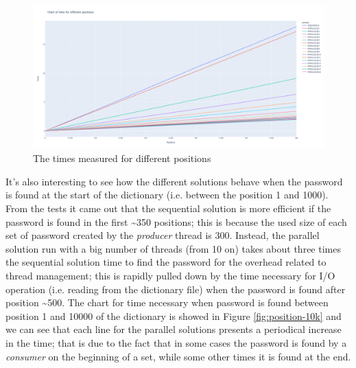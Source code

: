 \documentclass[10pt,twocolumn,letterpaper]{article}
\begin{document}
    \begin{figure}
    \begin{center}
    \includegraphics[width=1.0\linewidth]{./img/positions.png}
    \end{center}
        \caption{The times measured for different positions}
    \label{fig:position}
    \end{figure}

    It’s also interesting to see how the different solutions behave when the password
    is found at the start of the dictionary (i.e. between the position 1 and 1000).
    From the tests it came out that the sequential solution is more efficient if the
    password is found in the first \textasciitilde350 positions; this is because the used size of
    each set of password created by the \emph{producer} thread is 300.
    Instead, the parallel solution run with a big number of threads (from 10 on) takes
    about three times the sequential solution time to find the password for the overhead
    related to thread management; this is rapidly pulled down by the time necessary for
    I/O operation (i.e. reading from the dictionary file) when the password is found
    after position \textasciitilde500.
    The chart for time necessary when password is found between position 1 and 10000 of
    the dictionary is showed in Figure \ref{fig:position-10k} and we can see that each line
    for the parallel solutions presents a periodical increase in the time; that is due to the
    fact that in some cases the password is found by a \emph{consumer} on the beginning of a set,
    while some other times it is found at the end.
\end{document}

